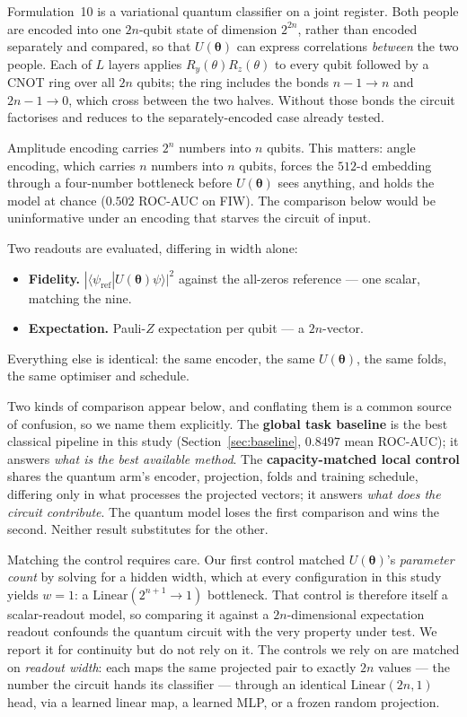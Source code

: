 \documentclass[preprint,12pt]{elsarticle}
\newcommand{\braket}[2]{\langle#1|#2\rangle}
\begin{document}
Formulation~10 is a variational quantum classifier on a joint register.
Both people are encoded into one $2n$-qubit state of dimension $2^{2n}$,
rather than encoded separately and compared, so that $U(\bm{\theta})$ can
express correlations \emph{between} the two people. Each of $L$ layers applies
$R_y(\theta) R_z(\theta)$ to every qubit followed by a CNOT ring over all $2n$
qubits; the ring includes the bonds $n-1 \to n$ and $2n-1 \to 0$, which cross
between the two halves. Without those bonds the circuit factorises and reduces
to the separately-encoded case already tested.

Amplitude encoding carries $2^n$ numbers into $n$ qubits. This matters: angle
encoding, which carries $n$ numbers into $n$ qubits, forces the $512$-d
embedding through a four-number bottleneck before $U(\bm{\theta})$ sees
anything, and holds the model at chance ($0.502$ ROC-AUC on FIW). The
comparison below would be uninformative under an encoding that starves the
circuit of input.

Two readouts are evaluated, differing in width alone:

\begin{itemize}
\item \textbf{Fidelity.} $|\braket{\psi_{\text{ref}}}{U(\bm{\theta})\psi}|^2$
against the all-zeros reference --- one scalar, matching the nine.
\item \textbf{Expectation.} Pauli-$Z$ expectation per qubit --- a $2n$-vector.
\end{itemize}

Everything else is identical: the same encoder, the same $U(\bm{\theta})$, the
same folds, the same optimiser and schedule.

Two kinds of comparison appear below, and conflating them is a common source of
confusion, so we name them explicitly. The \textbf{global task baseline} is the
best classical pipeline in this study (Section~\ref{sec:baseline},
$0.8497$ mean ROC-AUC); it answers \emph{what is the best available method}.
The \textbf{capacity-matched local control} shares the quantum arm's encoder,
projection, folds and training schedule, differing only in what processes the
projected vectors; it answers \emph{what does the circuit contribute}. The
quantum model loses the first comparison and wins the second. Neither result
substitutes for the other.

Matching the control requires care. Our first control matched
$U(\bm{\theta})$'s \emph{parameter count} by solving for a hidden width, which
at every configuration in this study yields $w=1$: a
$\mathrm{Linear}(2^{n+1} \to 1)$ bottleneck. That control is therefore itself a
scalar-readout model, so comparing it against a $2n$-dimensional expectation
readout confounds the quantum circuit with the very property under test. We
report it for continuity but do not rely on it. The controls we rely on are
matched on \emph{readout width}: each maps the same projected pair to exactly
$2n$ values --- the number the circuit hands its classifier --- through an
identical $\mathrm{Linear}(2n, 1)$ head, via a learned linear map, a learned
MLP, or a frozen random projection.
\end{document}
